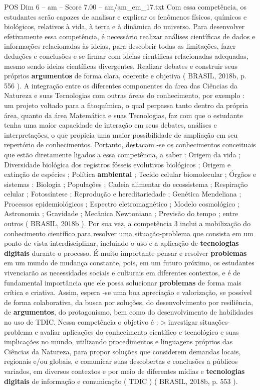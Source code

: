 \begin{textsample}{POS Dim 6 – am – Score 7.00 – am/am\_em\_17.txt}
Com essa competência, os estudantes serão capazes de analisar e explicar os fenômenos físicos, químicos e biológicos, relativos à vida, à terra e à dinâmica do universo.
Para desenvolver efetivamente essa competência, é necessário realizar análises científicas de dados e informações relacionadas às ideias, para descobrir todas as limitações, fazer deduções e conclusões e se firmar com ideias científicas relacionadas adequadas, mesmo sendo ideias científicas divergentes.
Realizar debates e construir seus próprios \textbf{argumentos} de forma clara, coerente e objetiva ( BRASIL, 2018b, p. 556 ).
A integração entre os diferentes componentes da área das Ciências da Natureza e suas Tecnologias com outras áreas do conhecimento, por exemplo : um projeto voltado para a fitoquímica, o qual perpassa tanto dentro da própria área, quanto da área Matemática e suas Tecnologias, faz com que o estudante tenha uma maior capacidade de interação em seus debates, análises e interpretações, o que propicia uma maior possibilidade de ampliação em seu repertório de conhecimentos.
Portanto, destacam -se os conhecimentos conceituais que estão diretamente ligados a essa competência, a saber : Origem da vida ; Diversidade biológica dos registros fósseis evolutivos biológicos ; Origem e extinção de espécies ; Política \textbf{ambiental} ; Tecido celular biomolecular ; Órgãos e sistemas : Biologia ; Populações ; Cadeia alimentar do ecossistema ; Respiração celular ; Fotossíntese ; Reprodução e hereditariedade ; Genética Mendeliana ; Processos epidemiológicos ; Espectro eletromagnético ; Modelo cosmológico ; Astronomia ; Gravidade ; Mecânica Newtoniana ; Previsão do tempo ; entre outros ( BRASIL, 2018b ).
Por sua vez, a competência 3 inclui a mobilização do conhecimento científico para resolver uma situação-problema que consista em um ponto de vista interdisciplinar, incluindo o uso e a aplicação de \textbf{tecnologias} \textbf{digitais} durante o processo.
É muito importante pensar e resolver \textbf{problemas} em um mundo de mudança constante, pois, em um futuro próximo, os estudantes vivenciarão as necessidades sociais e culturais em diferentes contextos, e é de fundamental importância que ele possa solucionar \textbf{problemas} de forma mais crítica e criativa.
Assim, espera -se uma boa apreciação e valorização, se possível de forma colaborativa, da busca por soluções, do desenvolvimento por resiliência, de \textbf{argumentos}, do protagonismo, bem como do desenvolvimento de habilidades no uso de TDIC.
Nessa competência o objetivo é : > investigar situações-problema e avaliar aplicações do conhecimento científico e tecnológico e suas implicações no mundo, utilizando procedimentos e linguagens próprios das Ciências da Natureza, para propor soluções que considerem demandas locais, regionais e/ou globais, e comunicar suas descobertas e conclusões a públicos variados, em diversos contextos e por meio de diferentes mídias e \textbf{tecnologias} \textbf{digitais} de informação e comunicação ( TDIC ) ( BRASIL, 2018b, p. 553 ).

\end{textsample}
